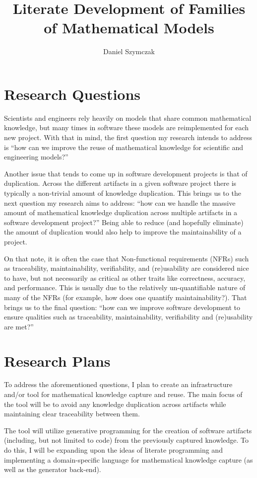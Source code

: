 \documentclass[11pt]{article} %
\title{Literate Development of Families of Mathematical Models}
\author{Daniel Szymczak}
\begin{document}
\maketitle

\section{Research Questions}

Scientists and engineers rely heavily on models that share common mathematical
knowledge, but many times in software these models are reimplemented for each
new project. With that in mind, the first question my research intends to
address is ``how can we improve the reuse of mathematical knowledge for
scientific and engineering models?''

Another issue that tends to come up in software development projects is that of
duplication. Across the different artifacts in a given software project
there is typically a non-trivial amount of knowledge duplication. This brings us
to the next question my research aims to address: ``how can we handle the 
massive amount of mathematical knowledge duplication across multiple artifacts
in a software development project?'' Being able to reduce (and hopefully
eliminate) the amount of duplication would also help to improve the 
maintainability of a project.

On that note, it is often the case that Non-functional requirements (NFRs) such
as traceability, maintainability, verifiability, and (re)usability are 
considered nice to have,
but not necessarily as critical as other traits like correctness, accuracy, and
performance. This is usually due to the relatively un-quantifiable nature of 
many of the NFRs (for example, how does one quantify maintainability?). That 
brings us to the final question: ``how can we improve software development to
ensure qualities such as traceability, maintainability, verifiability and
(re)usability are met?''

\section{Research Plans}

To address the aforementioned questions, I plan to create an 
infrastructure and/or tool for mathematical knowledge capture and reuse. The 
main focus of the tool will be to avoid any knowledge duplication across
artifacts while maintaining clear traceability between them.

The tool will utilize generative programming for the creation of software
artifacts (including, but not limited to code) from the previously captured
knowledge. To do this, I will be expanding upon the ideas of literate
programming and implementing a domain-specific language for mathematical
knowledge capture (as well as the generator back-end).
\end{document}
